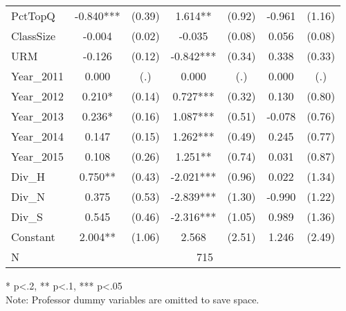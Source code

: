 \begin{sidewaystable}[htb]
\begin{threeparttable}
\begin{tabular}{l|c|c|c|c|c|c}
      PctTopQ           & -0.840***                    & (0.39)                       & 1.614**              & (0.92)               & -0.961               & (1.16)               \\
      ClassSize         & -0.004                       & (0.02)                       & -0.035               & (0.08)               & 0.056                & (0.08)               \\
      URM               & -0.126                       & (0.12)                       & -0.842***            & (0.34)               & 0.338                & (0.33)               \\
      Year\_2011         & 0.000                        & (.)                          & 0.000                & (.)                  & 0.000                & (.)                  \\
      Year\_2012         & 0.210*                       & (0.14)                       & 0.727***             & (0.32)               & 0.130                & (0.80)               \\
      Year\_2013         & 0.236*                       & (0.16)                       & 1.087***             & (0.51)               & -0.078               & (0.76)               \\
      Year\_2014         & 0.147                        & (0.15)                       & 1.262***             & (0.49)               & 0.245                & (0.77)               \\
      Year\_2015         & 0.108                        & (0.26)                       & 1.251**              & (0.74)               & 0.031                & (0.87)               \\
      Div\_H            & 0.750**                      & (0.43)                       & -2.021***            & (0.96)               & 0.022                & (1.34)               \\
      Div\_N            & 0.375                        & (0.53)                       & -2.839***            & (1.30)               & -0.990               & (1.22)               \\
      Div\_S            & 0.545                        & (0.46)                       & -2.316***            & (1.05)               & 0.989                & (1.36)               \\
      Constant          & 2.004**                      & (1.06)                       & 2.568                & (2.51)               & 1.246                & (2.49)               \\
      \hline
      N & \multicolumn{6}{|c}{715} \\
      \hline
      \hline
    \end{tabular}
    \begin{tablenotes}
    \item{* p<.2, ** p<.1, *** p<.05 \\ Note: Professor dummy variables are omitted to save space.}
    \end{tablenotes}
  \end{threeparttable}
\end{sidewaystable}

